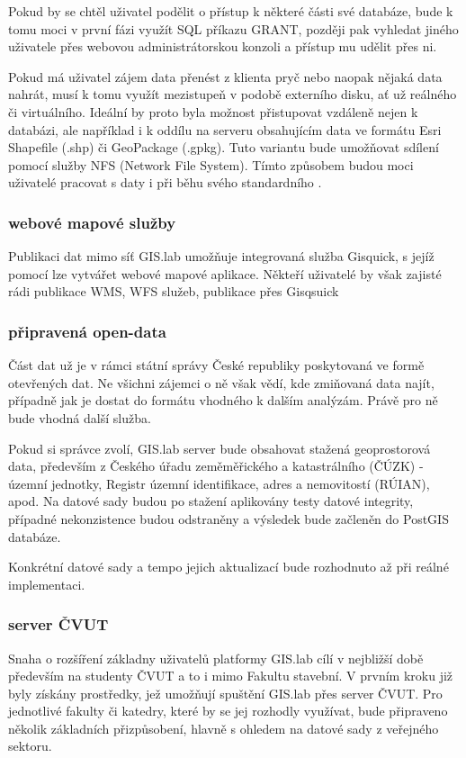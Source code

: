Pokud by se chtěl uživatel podělit o přístup k některé části své
databáze, bude k tomu moci v první fázi využít SQL příkazu GRANT,
později pak vyhledat jiného uživatele přes webovou administrátorskou
konzoli a přístup mu udělit přes ni.

Pokud má uživatel zájem data přenést z klienta pryč nebo naopak nějaká
data nahrát, musí k tomu využít mezistupeň v podobě externího disku,
ať už reálného či virtuálního. Ideální by proto byla možnost
přistupovat vzdáleně nejen k databázi, ale například i k oddílu na
serveru obsahujícím data ve formátu Esri Shapefile (.shp) či
GeoPackage (.gpkg). Tuto variantu bude umožňovat sdílení pomocí služby
NFS (Network File System). Tímto způsobem budou moci uživatelé
pracovat s daty i při běhu svého standardního .

\subsubsection{webové mapové služby}

Publikaci dat mimo síť GIS.lab umožňuje integrovaná služba Gisquick, s
jejíž pomocí lze vytvářet webové mapové aplikace. Někteří uživatelé by
však zajisté rádi publikace WMS, WFS služeb, publikace přes Gisqsuick

\subsubsection{připravená open-data}

Část dat už je v rámci státní správy České republiky poskytovaná ve
formě otevřených dat. Ne všichni zájemci o ně však vědí, kde zmiňovaná
data najít, případně jak je dostat do formátu vhodného k dalším
analýzám. Právě pro ně bude vhodná další služba.

Pokud si správce zvolí, GIS.lab server bude obsahovat stažená
geoprostorová data, především z Českého úřadu zeměměřického a
katastrálního (ČÚZK) - územní jednotky, Registr územní identifikace,
adres a nemovitostí (RÚIAN), apod. Na datové sady budou po stažení
aplikovány testy datové integrity, případné nekonzistence budou
odstraněny a výsledek bude začleněn do PostGIS databáze.

Konkrétní datové sady a tempo jejich aktualizací bude rozhodnuto až
při reálné implementaci.

\subsubsection{server ČVUT}
Snaha o rozšíření základny uživatelů platformy GIS.lab cílí v
nejbližší době především na studenty ČVUT a to i mimo Fakultu
stavební. V prvním kroku již byly získány prostředky, jež umožňují
spuštění GIS.lab přes server ČVUT. Pro jednotlivé fakulty či katedry,
které by se jej rozhodly využívat, bude připraveno několik základních
přizpůsobení, hlavně s ohledem na datové sady z veřejného sektoru.

